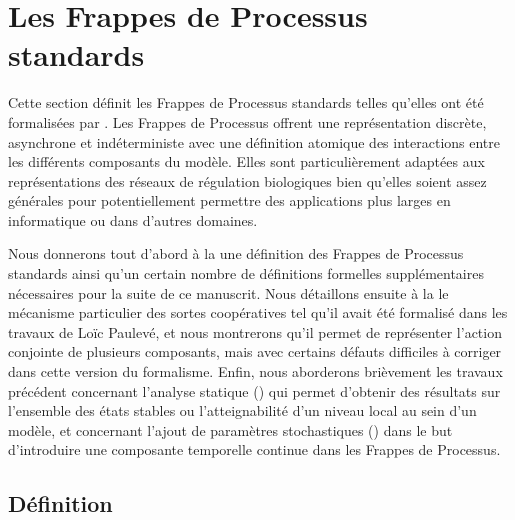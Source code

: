 \section{Les Frappes de Processus standards}

Cette section définit les Frappes de Processus standards
telles qu'elles ont été formalisées par .
Les Frappes de Processus offrent une représentation discrète, asynchrone et indéterministe
avec une définition atomique des interactions entre les différents composants du modèle.
Elles sont particulièrement adaptées aux représentations des réseaux de régulation biologiques
bien qu'elles soient assez générales pour potentiellement permettre des applications plus
larges en informatique ou dans d'autres domaines.

Nous donnerons tout d'abord à la  une définition des Frappes de Processus standards
ainsi qu'un certain nombre de définitions formelles supplémentaires
nécessaires pour la suite de ce manuscrit.
Nous détaillons ensuite à la  le mécanisme particulier des sortes coopératives
tel qu'il avait été formalisé dans les travaux de Loïc Paulevé,
et nous montrerons qu'il permet de représenter l'action conjointe de plusieurs composants,
mais avec certains défauts difficiles à corriger dans cette version du formalisme.
Enfin, nous aborderons brièvement les travaux précédent
concernant l'analyse statique () qui permet d'obtenir des résultats
sur l'ensemble des états stables ou l'atteignabilité d'un niveau local au sein d'un modèle,
et concernant l'ajout de paramètres stochastiques ()
dans le but d'introduire une composante temporelle continue dans les Frappes de Processus.



\subsection{Définition}


